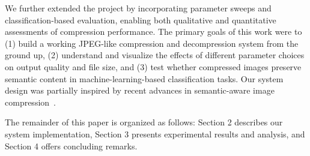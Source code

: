 We further extended the project by incorporating parameter sweeps and classification-based evaluation, enabling both qualitative and quantitative assessments of compression performance. The primary goals of this work were to (1) build a working JPEG-like compression and decompression system from the ground up, (2) understand and visualize the effects of different parameter choices on output quality and file size, and (3) test whether compressed images preserve semantic content in machine-learning-based classification tasks. Our system design was partially inspired by recent advances in semantic-aware image compression~\cite{semanticDiffusion2023}.


The remainder of this paper is organized as follows: Section 2 describes our system implementation, Section 3 presents experimental results and analysis, and Section 4 offers concluding remarks.
